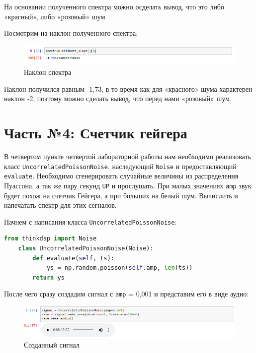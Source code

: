\documentclass[a4paper]{article}
\begin{document}
            На основании полученного спектра можно осделать вывод, что это либо «красный», либо «розовый» шум
            
            Посмотрим на наклон полученного спектра:
            
            \begin{figure}[H]
                \centering
                \includegraphics[width=\textwidth]{ex_3_bitcoin_extimate_slope.png}
                \caption{Наклон спектра}
                \label{fig:ex_3_bitcoin_extimate_slope}
            \end{figure}
            
            Наклон получился равным -1,73, в то время как для «красного» шума характерен наклон -2, поэтому можно сделать вывод, что перед нами «розовый» шум.
            
    \newpage
        \section{Часть №4: Счетчик гейгера}
           В четвертом пункте четвертой лабораторной работы нам необходимо реализовать класс  \texttt{UncorrelatedPoissonNoise}, наследующий \texttt{Noise} и предоставляющий \texttt{evaluate}. Необходимо сгенерировать случайные величины из распределения Пуассона, а так же пару секунд \texttt{UP} и прослушать. При малых значениях \texttt{amp} звук будет похож на счетчик Гейгера, а при больших на белый шум. Вычислить и напечатать спектр для этих сегналов.
           
           Начнем с написания класса \texttt{UncorrelatedPoissonNoise}:
           
\begin{lstlisting}[language=Python, caption= Построение логарифмического спектра]
    from thinkdsp import Noise
    class UncorrelatedPoissonNoise(Noise):
        def evaluate(self, ts):
            ys = np.random.poisson(self.amp, len(ts))
        return ys
\end{lstlisting} 
           
           После чего сразу создадим сигнал с \texttt{amp} = 0,001 и представим его в виде аудио:
           
           \begin{figure}[H]
                \centering
                \includegraphics[width=\textwidth]{ex_4_signal_audio.png}
                \caption{Созданный сигнал}
                \label{fig:ex_4_signal_audio}
            \end{figure}
            
\end{document}

